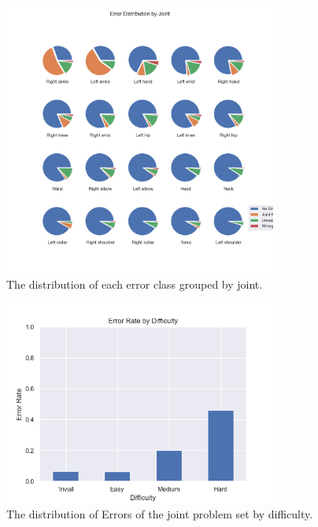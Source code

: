 \begin{figure}
  \centering
  \includegraphics[width=0.8\textwidth]{figures/Data/dist_joints/Error_Distribution_by_Joint.png}
  \caption[Error Distribution for each error class by joint]{The distribution of each error class grouped by joint.}
  \label{fig:jt_pie_joint}
\end{figure}


\begin{figure}
  \centering
  \includegraphics[width=0.8\textwidth]{figures/Data/dist_joints/Error_Rate_by_Difficulty.png}
  \caption[Error Distribution of the joints by difficulty]{The distribution of Errors of the joint problem set by difficulty.}
  \label{fig:jt_diff_dist}
\end{figure}

